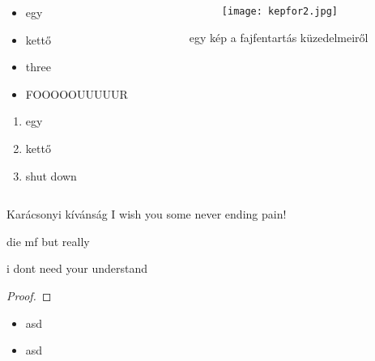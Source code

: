 \documentclass{beamer}
\begin{document}
\begin{frame}
	\begin{columns}[c]
		\begin{column}{.5\linewidth}
			\begin{itemize}
				\item egy
				\item kettő
				\item three
				\item FOOOOOUUUUUR
			\end{itemize}
			\begin{enumerate}
				\item egy
				\item kettő
				\item shut down
			\end{enumerate}
		\end{column}
		\begin{column}{.5\linewidth}
			\begin{figure}
			\texttt{[image: kepfor2.jpg]}
			\end{figure}
			egy kép a fajfentartás küzedelmeiről
		\end{column}
	\end{columns}
\end{frame}
\begin{frame}
	\begin{block}{Karácsonyi kívánság}
	I wish you some never ending pain!
	\end{block}
	\begin{exampleblock}{die mf}
	but really
	\end{exampleblock}
	\begin{alertblock}{}
	i dont need your understand
	\end{alertblock}
\end{frame}
\begin{frame}
	\begin{theorem}[HULIPSUM]
	\hulipsum[1]
	\end{theorem}
	\begin{proof}
	\hulipsum[1]
	\end{proof}
\end{frame}
\begin{frame}
	\begin{semiverbatim}
		\begin{itemize}
		\color{pink}\item asd
		\color{purple}\item asd
		\end{itemize}
	\end{semiverbatim}
\end{frame}
\end{document}
